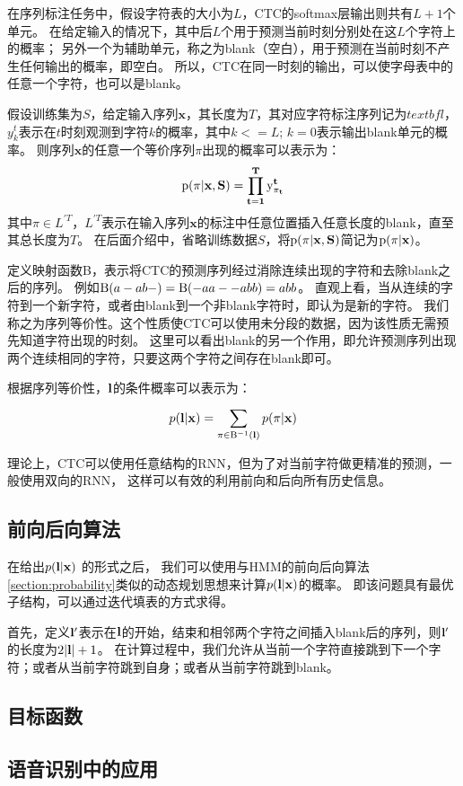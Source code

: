 在序列标注任务中，假设字符表的大小为$L$，CTC的softmax层输出则共有$L+1$个单元。
在给定输入的情况下，其中后$L$个用于预测当前时刻分别处在这$L$个字符上的概率；
另外一个为辅助单元，称之为blank（空白），用于预测在当前时刻不产生任何输出的概率，即空白。
所以，CTC在同一时刻的输出，可以使字母表中的任意一个字符，也可以是blank。

假设训练集为$S$，给定输入序列$\textbf{x}$，其长度为$T$，其对应字符标注序列记为$textbf{l}$，
$y_k^t$表示在$t$时刻观测到字符$k$的概率，其中$k<=L$; $k=0$表示输出blank单元的概率。
则序列$\textbf{x}$的任意一个等价序列$\pi$出现的概率可以表示为：
\begin{equation}
{\rm{p}}(\pi |\bf{x},S) = \prod\limits_{t = 1}^T {{\rm{y}}_{{\pi _t}}^t}
\end{equation}
其中$\pi  \in {L^{'T}}$，$L^{'T}$表示在输入序列$\textbf{x}$的标注中任意位置插入任意长度的blank，直至其总长度为$T$。
在后面介绍中，省略训练数据$S$，将$\rm{p}(\pi |\bf{x},S)$简记为$\rm{p}(\pi|\bf{x})$。

定义映射函数{\rm B}，表示将CTC的预测序列经过消除连续出现的字符和去除blank之后的序列。
例如${\rm B}(a - ab - ) = {\rm B}( - aa -  - abb) = abb$。
直观上看，当从连续的字符到一个新字符，或者由blank到一个非blank字符时，即认为是新的字符。
我们称之为序列等价性。这个性质使CTC可以使用未分段的数据，因为该性质无需预先知道字符出现的时刻。
这里可以看出blank的另一个作用，即允许预测序列出现两个连续相同的字符，只要这两个字符之间存在blank即可。

根据序列等价性，$\bf{l}$的条件概率可以表示为：
\begin{equation}
p({\bf{l}}|{\bf{x}}) = \sum\limits_{\pi  \in {{\rm B}^{ - 1}}({\bf{l}})}^{} {p(\pi |{\bf{x}})}
\end{equation}

理论上，CTC可以使用任意结构的RNN，但为了对当前字符做更精准的预测，一般使用双向的RNN，
这样可以有效的利用前向和后向所有历史信息。

\subsection{前向后向算法}

在给出$p({\bf{l}}|{\bf{x}})$ 的形式之后，
我们可以使用与HMM的前向后向算法\ref{section:probability}类似的动态规划思想来计算$p({\bf{l}}|{\bf{x}})$的概率。
即该问题具有最优子结构，可以通过迭代填表的方式求得。

首先，定义${{\bf{l'}}}$表示在$\bf{l}$的开始，结束和相邻两个字符之间插入blank后的序列，则${{\bf{l'}}}$的长度为$2|{\bf{l}}| + 1$。
在计算过程中，我们允许从当前一个字符直接跳到下一个字符；或者从当前字符跳到自身；或者从当前字符跳到blank。

\subsection{目标函数}

\subsection{语音识别中的应用}






